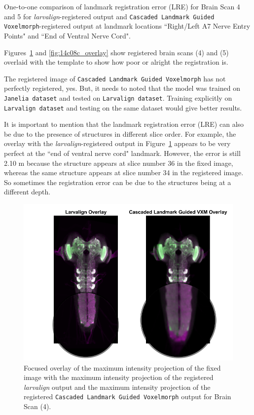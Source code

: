 \documentclass{book}
\begin{document}
	\begin{table}[H]
		\centering
		
		\caption{One-to-one comparison of landmark registration error (LRE) for Brain Scan 4 and 5 for \textit{larvalign}-registered output and \texttt{Cascaded Landmark Guided Voxelmorph}-registered output at landmark locations ``Right/Left A7 Nerve Entry Points" and ``End of Ventral Nerve Cord".}
		\label{table:brain45_lre}
	\end{table}
	
	Figures~\ref{fig:14c08b_overlay} and \ref{fig:14c08c_overlay} show registered brain scans (4) and (5) overlaid with the template to show how poor or alright the registration is.

	The registered image of \texttt{Cascaded Landmark Guided Voxelmorph} has not perfectly registered, yes. But, it needs to noted that the model was trained on \texttt{Janelia dataset} and tested on \texttt{Larvalign dataset}. Training explicitly on \texttt{Larvalign dataset} and testing on the same dataset would give better results.
	
	It is important to mention that the landmark registration error (LRE) can also be due to the presence of structures in different slice order. For example, the overlay with the \textit{larvalign}-registered output in Figure~\ref{fig:14c08b_overlay} appears to be very perfect at the ``end of ventral nerve cord" landmark. However, the error is still 2.10 \textmu m because the structure appears at slice number 36 in the fixed image, whereas the same structure appears at slice number 34 in the registered image. So sometimes the registration error can be due to the structures being at a different depth.
	
	\begin{figure}[h!]
		\centering
		\includegraphics[width=0.7\columnwidth]{resources/chapter7/LRE_Visual/14c08b_overlay_zoomed.png}
		\caption{Focused overlay of the maximum intensity projection of the fixed image with the maximum intensity projection of the registered \textit{larvalign} output and the maximum intensity projection of the registered \texttt{Cascaded Landmark Guided Voxelmorph} output for Brain Scan (4).}
		\label{fig:14c08b_overlay}
	\end{figure}
	
\end{document}
